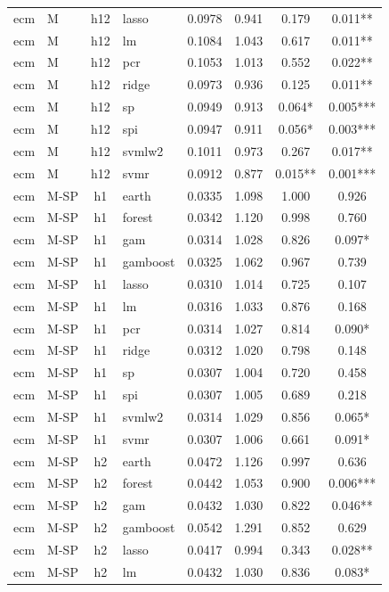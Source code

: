 \begin{ThreePartTable}
\begin{longtable}[t]{llclcccc}
ecm & M & h12 & lasso & 0.0978 & 0.941 & 0.179 & 0.011**\\
ecm & M & h12 & lm & 0.1084 & 1.043 & 0.617 & 0.011**\\
ecm & M & h12 & pcr & 0.1053 & 1.013 & 0.552 & 0.022**\\
ecm & M & h12 & ridge & 0.0973 & 0.936 & 0.125 & 0.011**\\
ecm & M & h12 & sp & 0.0949 & 0.913 & 0.064* & 0.005***\\
ecm & M & h12 & spi & 0.0947 & 0.911 & 0.056* & 0.003***\\
ecm & M & h12 & svmlw2 & 0.1011 & 0.973 & 0.267 & 0.017**\\
ecm & M & h12 & svmr & 0.0912 & 0.877 & 0.015** & 0.001***\\
\addlinespace
ecm & M-SP & h1 & earth & 0.0335 & 1.098 & 1.000 & 0.926\\
ecm & M-SP & h1 & forest & 0.0342 & 1.120 & 0.998 & 0.760\\
ecm & M-SP & h1 & gam & 0.0314 & 1.028 & 0.826 & 0.097*\\
ecm & M-SP & h1 & gamboost & 0.0325 & 1.062 & 0.967 & 0.739\\
ecm & M-SP & h1 & lasso & 0.0310 & 1.014 & 0.725 & 0.107\\
ecm & M-SP & h1 & lm & 0.0316 & 1.033 & 0.876 & 0.168\\
ecm & M-SP & h1 & pcr & 0.0314 & 1.027 & 0.814 & 0.090*\\
ecm & M-SP & h1 & ridge & 0.0312 & 1.020 & 0.798 & 0.148\\
ecm & M-SP & h1 & sp & 0.0307 & 1.004 & 0.720 & 0.458\\
ecm & M-SP & h1 & spi & 0.0307 & 1.005 & 0.689 & 0.218\\
ecm & M-SP & h1 & svmlw2 & 0.0314 & 1.029 & 0.856 & 0.065*\\
ecm & M-SP & h1 & svmr & 0.0307 & 1.006 & 0.661 & 0.091*\\
\addlinespace
ecm & M-SP & h2 & earth & 0.0472 & 1.126 & 0.997 & 0.636\\
ecm & M-SP & h2 & forest & 0.0442 & 1.053 & 0.900 & 0.006***\\
ecm & M-SP & h2 & gam & 0.0432 & 1.030 & 0.822 & 0.046**\\
ecm & M-SP & h2 & gamboost & 0.0542 & 1.291 & 0.852 & 0.629\\
ecm & M-SP & h2 & lasso & 0.0417 & 0.994 & 0.343 & 0.028**\\
ecm & M-SP & h2 & lm & 0.0432 & 1.030 & 0.836 & 0.083*\\

\end{longtable}
\end{ThreePartTable}
